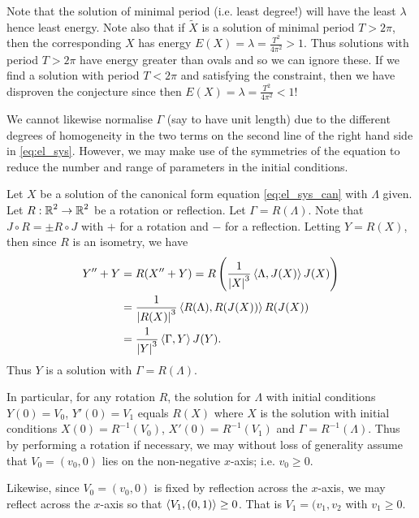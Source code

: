 \documentclass[12pt]{article}
\begin{document}
\begin{rem}
Note that the solution of minimal period (i.e. least degree!) will have the least \(\lambda\) hence least energy. Note also that if \(\tilde{X}\) is a solution of minimal period \(T > 2\pi\), then the corresponding \(X\) has energy \(E(X) = \lambda = \tfrac{T^2}{4\pi^2} > 1\). Thus solutions with period \(T > 2\pi\) have energy greater than ovals and so we can ignore these. If we find a solution with period \(T < 2\pi\) and satisfying the constraint, then we have disproven the conjecture since then \(E(X) = \lambda = \tfrac{T^2}{4\pi^2} < 1\)!
\end{rem}

We cannot likewise normalise \(\Gamma\) (say to have unit length) due to the different degrees of homogeneity in the two terms on the second line of the right hand side in \eqref{eq:el_sys}. However, we may make use of the symmetries of the equation to reduce the number and range of parameters in the initial conditions.

Let \(X\) be a solution of the canonical form equation \eqref{eq:el_sys_can} with \(\Lambda\) given. Let \(R : \operatorname{\mathbb{R}}^2 \to \operatorname{\mathbb{R}}^2\) be a rotation or reflection. Let \(\Gamma = R(\Lambda)\). Note that \(J \circ R = \pm R \circ J\) with \(+\) for a rotation and \(-\) for a reflection. Letting \(Y = R(X)\), then since \(R\) is an isometry, we have
\[
\begin{split}
Y'' + Y &= R(X'' + Y) = R\left(\frac{1}{\left|{X}\right|^3} \left\langle{\Lambda},{J(X)}\right\rangle J(X)\right) \\
&= \frac{1}{\left|{R(X)}\right|^3} \left\langle{R(\Lambda)},{R(J(X))}\right\rangle R(J(X)) \\
&= \frac{1}{\left|{Y}\right|^3} \left\langle{\Gamma},{Y}\right\rangle J(Y).
\end{split}
\]
Thus \(Y\) is a solution with \(\Gamma = R(\Lambda)\).

In particular, for any rotation \(R\), the solution for \(\Lambda\) with initial conditions \(Y(0) = V_0\), \(Y'(0) = V_1\) equals \(R(X)\) where \(X\) is the solution with initial conditions \(X(0) = R^{-1}(V_0)\), \(X'(0) = R^{-1}(V_1)\) and \(\Gamma = R^{-1}(\Lambda)\). Thus by performing a rotation if necessary, we may without loss of generality assume that \(V_0 = (v_0, 0)\) lies on the non-negative \(x\)-axis; i.e. \(v_0 \geq 0\).

Likewise, since \(V_0 = (v_0, 0)\) is fixed by reflection across the \(x\)-axis, we may reflect across the \(x\)-axis so that \(\left\langle{V_1},{(0, 1)}\right\rangle \geq 0\). That is \(V_1 = (v_1, v_2\) with \(v_1 \geq 0\).
\end{document}
